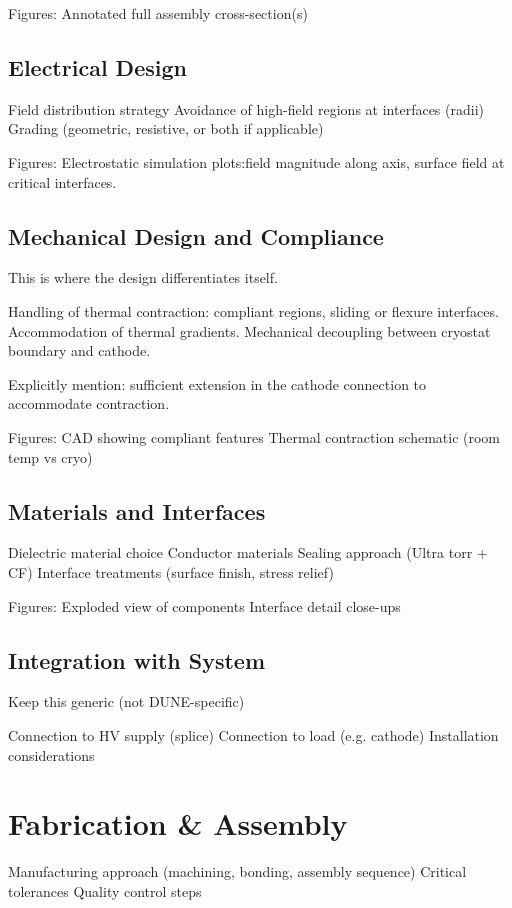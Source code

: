 \documentclass[a4paper,12pt]{article}
\begin{document}
Figures:
Annotated full assembly cross-section(s)

\subsection{Electrical Design}
Field distribution strategy
Avoidance of high-field regions at interfaces (radii)
Grading (geometric, resistive, or both if applicable)

Figures:
Electrostatic simulation plots:field magnitude along axis, surface field at critical interfaces. 

\subsection{Mechanical Design and Compliance}
This is where the design differentiates itself.

Handling of thermal contraction: compliant regions, sliding or flexure interfaces.
Accommodation of thermal gradients.
Mechanical decoupling between cryostat boundary and cathode.

Explicitly mention: sufficient extension in the cathode connection to accommodate contraction.

Figures:
CAD showing compliant features
Thermal contraction schematic (room temp vs cryo)

\subsection{Materials and Interfaces}
Dielectric material choice
Conductor materials
Sealing approach (Ultra torr + CF)
Interface treatments (surface finish, stress relief)

Figures:
Exploded view of components
Interface detail close-ups

\subsection{Integration with System}
Keep this generic (not DUNE-specific)

Connection to HV supply (splice)
Connection to load (e.g. cathode)
Installation considerations

\section{Fabrication & Assembly}
\label{sec:fab}
Manufacturing approach (machining, bonding, assembly sequence)
Critical tolerances
Quality control steps
\end{document}
